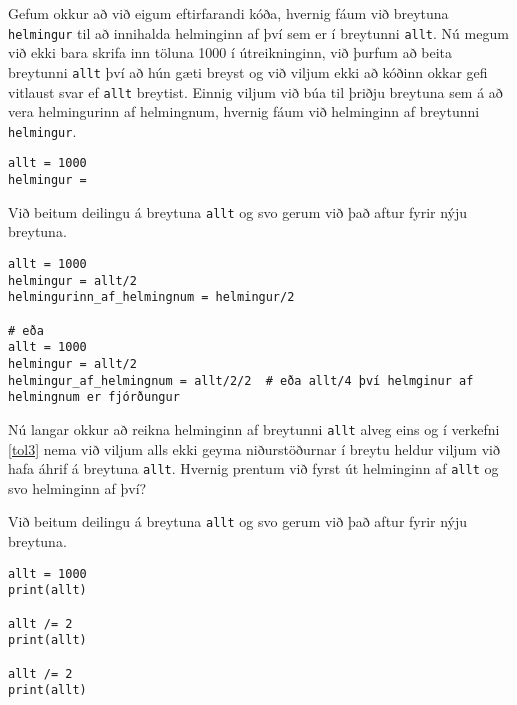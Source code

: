 \begin{exercise}\label{tol3}
	Gefum okkur að við eigum eftirfarandi kóða, hvernig fáum við breytuna \texttt{helmingur} til að innihalda helminginn af því sem er í breytunni \texttt{allt}.
	Nú megum við ekki bara skrifa inn töluna 1000 í útreikninginn, við þurfum að beita breytunni \texttt{allt} því að hún gæti breyst og við viljum ekki að kóðinn okkar gefi vitlaust svar ef \texttt{allt} breytist.
	Einnig viljum við búa til þriðju breytuna sem á að vera helmingurinn af helmingnum, hvernig fáum við helminginn af breytunni \texttt{helmingur}.
\begin{lstlisting}
allt = 1000
helmingur =\end{lstlisting}
\end{exercise}
\begin{Answer}[ref={tol3}]
	Við beitum deilingu á breytuna \texttt{allt} og svo gerum við það aftur fyrir nýju breytuna.
\begin{lstlisting}
allt = 1000
helmingur = allt/2
helmingurinn_af_helmingnum = helmingur/2

# eða
allt = 1000
helmingur = allt/2
helmingur_af_helmingnum = allt/2/2  # eða allt/4 því helmginur af helmingnum er fjórðungur\end{lstlisting}
\end{Answer}


\begin{exercise}\label{tol4}
	Nú langar okkur að reikna helminginn af breytunni \texttt{allt} alveg eins og í verkefni \ref{tol3} nema við viljum alls ekki geyma niðurstöðurnar í breytu heldur viljum við hafa áhrif á breytuna \texttt{allt}.
	Hvernig prentum við fyrst út helminginn af \texttt{allt} og svo helminginn af því?
\end{exercise}
\begin{Answer}[ref={tol4}]
	Við beitum deilingu á breytuna \texttt{allt} og svo gerum við það aftur fyrir nýju breytuna.
\begin{lstlisting}
allt = 1000
print(allt)

allt /= 2
print(allt)

allt /= 2
print(allt)\end{lstlisting}
\end{Answer}

